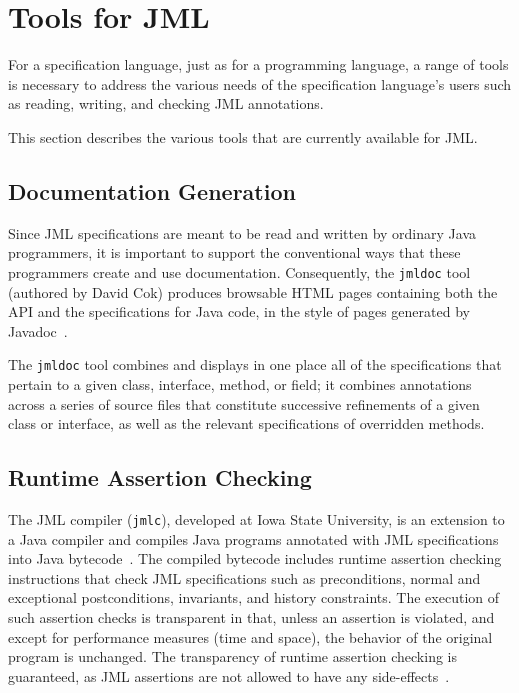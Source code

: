 \section{Tools for JML}
\label{tools}

For a specification language, just as for a programming language, a
range of tools is necessary to address the various needs of the
specification language's users such as reading, writing, and checking
JML annotations.

This section describes the various tools that are currently
available for JML.

\subsection{Documentation Generation}
\label{jmldoc}

Since JML specifications are meant to be read and written by ordinary
Java programmers, it is important to support the conventional ways
that these programmers create and use documentation.  Consequently,
the {\tt jmldoc} tool (authored by David Cok)
produces browsable HTML pages containing both the
API and the specifications for Java code, in the style of pages
generated by Javadoc~\cite{Friendly95}.

The {\tt jmldoc} tool combines and displays in one place all of the
specifications that pertain to a given class, interface, method, or
field; it combines annotations across a series of source files that
constitute successive refinements of a given class or interface, as
well as the relevant specifications of overridden methods.

\subsection{Runtime Assertion Checking}
\label{jmlc}

The JML compiler (\texttt{jmlc}), developed at Iowa State University,
is an extension to a Java compiler and compiles Java programs
annotated with JML specifications into Java
bytecode~\cite{Cheon03,Cheon-Leavens02b}.  The compiled bytecode includes
runtime assertion checking instructions that check JML specifications
such as preconditions, normal and exceptional postconditions,
invariants, and history constraints.  The execution of such assertion
checks is transparent in that, unless an assertion is violated, and
except for performance measures (time and space), the behavior of the
original program is unchanged.  The transparency of runtime assertion
checking is guaranteed, as JML assertions are not allowed to have any
side-effects~\cite{Leavens-etal03a}.

